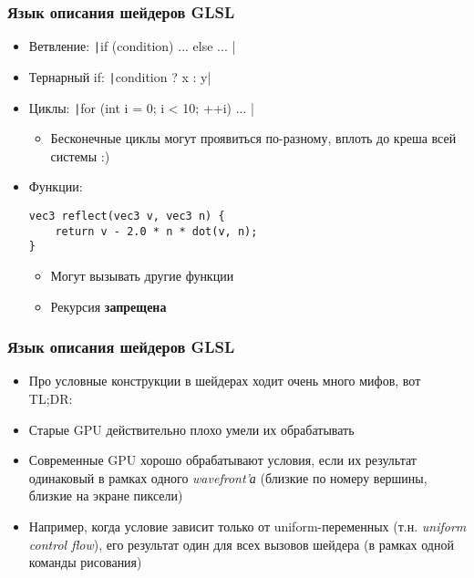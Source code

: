 \documentclass[10pt]{beamer}
\begin{document}
\begin{frame}[fragile]
\frametitle{Язык описания шейдеров GLSL}
\begin{itemize}
\item Ветвление: \texttt|if (condition) { ... } else { ... }|
\pause
\item Тернарный if: \texttt|condition ? x : y|
\pause
\item Циклы: \texttt|for (int i = 0; i < 10; ++i) { ... }|
\begin{itemize}
\item Бесконечные циклы могут проявиться по-разному, вплоть до креша всей системы :)
\end{itemize}
\pause
{}
\item Функции: \begin{verbatim}
vec3 reflect(vec3 v, vec3 n) {
    return v - 2.0 * n * dot(v, n);
}
\end{verbatim}
\pause
\begin{itemize}
\item Могут вызывать другие функции
\pause
\item Рекурсия \alert{\textbf{запрещена}}
\end{itemize}
\end{itemize}
\end{frame}

\begin{frame}[fragile]
\frametitle{Язык описания шейдеров GLSL}
\begin{itemize}
\item Про условные конструкции в шейдерах ходит очень много мифов, вот TL;DR:
\pause
\item Старые GPU действительно плохо умели их обрабатывать
\pause
\item Современные GPU хорошо обрабатывают условия, если их результат одинаковый в рамках одного \textit{wavefront'а} (близкие по номеру вершины, близкие на экране пиксели)
\pause
\item Например, когда условие зависит только от uniform-переменных (т.н. \textit{uniform control flow}), его результат один для всех вызовов шейдера (в рамках одной команды рисования)
\end{itemize}
\end{frame}
\end{document}

